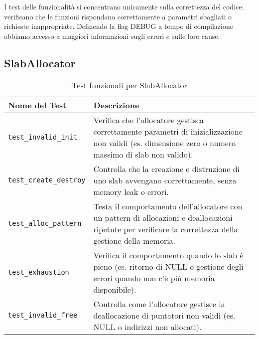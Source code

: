 I test delle funzionalità si concentrano unicamente sulla correttezza del codice: verificano che le funzioni rispondano correttamente a parametri sbagliati o richieste inappropriate. Definendo la flag DEBUG a tempo di compilazione abbiamo accesso a maggiori informazioni sugli errori e sulle loro cause.

\subsection*{SlabAllocator}
\begin{table}[H]
\centering
\begin{tabularx}{\textwidth}{|l|X|}
\hline
\textbf{Nome del Test} & \textbf{Descrizione} \\
\hline
\texttt{test\_invalid\_init} & Verifica che l'allocatore gestisca correttamente parametri di inizializzazione non validi (es. dimensione zero o numero massimo di slab non valido). \\
\hline
\texttt{test\_create\_destroy} & Controlla che la creazione e distruzione di uno slab avvengano correttamente, senza memory leak o errori. \\
\hline
\texttt{test\_alloc\_pattern} & Testa il comportamento dell'allocatore con un pattern di allocazioni e deallocazioni ripetute per verificare la correttezza della gestione della memoria. \\
\hline
\texttt{test\_exhaustion} & Verifica il comportamento quando lo slab è pieno (es. ritorno di NULL o gestione degli errori quando non c'è più memoria disponibile). \\
\hline
\texttt{test\_invalid\_free} & Controlla come l'allocatore gestisce la deallocazione di puntatori non validi (es. NULL o indirizzi non allocati). \\
\hline
\end{tabularx}
\caption{Test funzionali per SlabAllocator}
\end{table}


